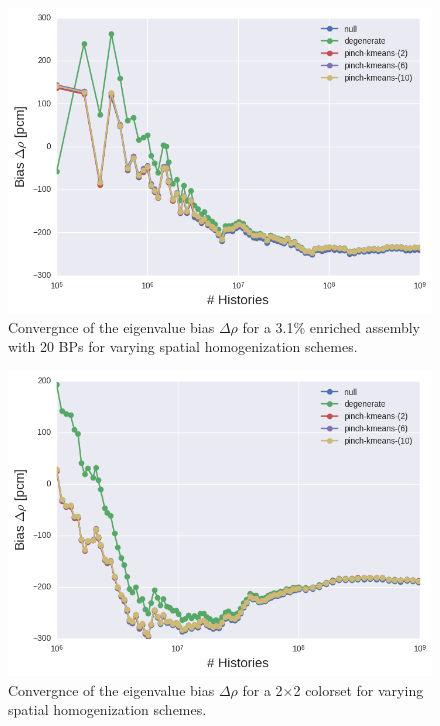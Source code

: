 \clearpage

\begin{figure}[h!]
\centering
\includegraphics[width=0.85\linewidth]{figures/results/assm-31-20BPs/no-transform/keff-bias}
\vspace{2mm}
\caption[Eigenvalue bias covergence for a 3.1\% enriched assembly with 20 \acp{BP}]{Convergnce of the eigenvalue bias $\Delta\rho$ for a 3.1\% enriched assembly with 20 \acp{BP} for varying spatial homogenization schemes.}
\label{fig:chap11-assm-3.1-20BPs-eigenvalue-converge}
\end{figure}

\begin{figure}[h!]
\centering
\includegraphics[width=0.85\linewidth]{figures/results/2x2/ensemble-transform/keff-bias}
\vspace{2mm}
\caption[Eigenvalue bias covergence for a 2$\times$2 colorset]{Convergnce of the eigenvalue bias $\Delta\rho$ for a 2$\times$2 colorset for varying spatial homogenization schemes.}
\label{fig:chap11-2x2-eigenvalue-converge}
\end{figure}

